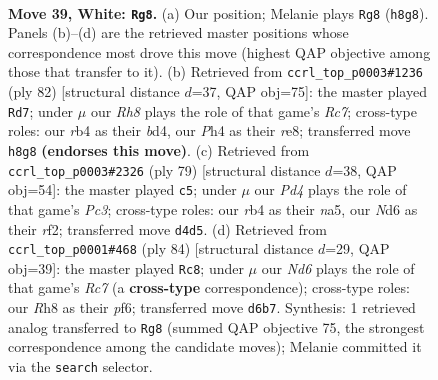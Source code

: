\documentclass[11pt]{article}
\begin{document}
\clearpage

\begin{figure}[p]\centering
\begin{subfigure}{0.46\textwidth}\centering
\resizebox{\linewidth}{!}{%
\newchessgame
\chessboard[
  setfen={7R/5pp1/3Np1k1/1p5p/1r1P1P1P/4P1P1/8/6K1 w - - 3 39},
  showmover=false,
  pgfstyle=straightmove, color=movearrow, markmove={h8-g8}
]}
\caption{}
\end{subfigure}\hfill
\begin{subfigure}{0.46\textwidth}\centering
\resizebox{\linewidth}{!}{%
\newchessgame
\chessboard[
  setfen={4r3/2R2p2/1p3kp1/p6p/P1Nb3P/1P4P1/5P2/5K2 w - - 11 42},
  showmover=false,
  pgfstyle=straightmove, color=movearrow, markmove={c7-d7}
]}
\caption{}
\end{subfigure}
\\[4pt]
\begin{subfigure}{0.46\textwidth}\centering
\resizebox{\linewidth}{!}{%
\newchessgame
\chessboard[
  setfen={7r/8/1np3k1/N3pp2/P5p1/2PK2P1/1P3R1P/8 b - - 0 40},
  showmover=false,
  pgfstyle=straightmove, color=movearrow, markmove={c6-c5}
]}
\caption{}
\end{subfigure}\hfill
\begin{subfigure}{0.46\textwidth}\centering
\resizebox{\linewidth}{!}{%
\newchessgame
\chessboard[
  setfen={8/p1R3p1/5pk1/4p2p/4P2P/2P3P1/r4P2/5K2 w - - 3 43},
  showmover=false,
  pgfstyle=straightmove, color=movearrow, markmove={c7-c8}
]}
\caption{}
\end{subfigure}
\caption{\textbf{Move 39, White: \texttt{Rg8}.} (a) Our position; Melanie plays \texttt{Rg8} (\texttt{h8g8}). Panels (b)--(d) are the retrieved master positions whose correspondence most drove this move (highest QAP objective among those that transfer to it). (b) Retrieved from \texttt{ccrl\_top\_p0003\#1236} (ply 82) [structural distance $d$=37, QAP obj=75]: the master played \texttt{Rd7}; under $\mu$ our \emph{Rh8} plays the role of that game's \emph{Rc7}; cross-type roles: our \emph{r}b4 as their \emph{b}d4, our \emph{P}h4 as their \emph{r}e8; transferred move \texttt{h8g8} \textbf{(endorses this move)}. (c) Retrieved from \texttt{ccrl\_top\_p0003\#2326} (ply 79) [structural distance $d$=38, QAP obj=54]: the master played \texttt{c5}; under $\mu$ our \emph{Pd4} plays the role of that game's \emph{Pc3}; cross-type roles: our \emph{r}b4 as their \emph{n}a5, our \emph{N}d6 as their \emph{r}f2; transferred move \texttt{d4d5}. (d) Retrieved from \texttt{ccrl\_top\_p0001\#468} (ply 84) [structural distance $d$=29, QAP obj=39]: the master played \texttt{Rc8}; under $\mu$ our \emph{Nd6} plays the role of that game's \emph{Rc7} (a \textbf{cross-type} correspondence); cross-type roles: our \emph{R}h8 as their \emph{p}f6; transferred move \texttt{d6b7}. Synthesis: 1 retrieved analog transferred to \texttt{Rg8} (summed QAP objective 75, the strongest correspondence among the candidate moves); Melanie committed it via the \texttt{search} selector.}
\label{fig:thought-m76}
\end{figure}
\end{document}
